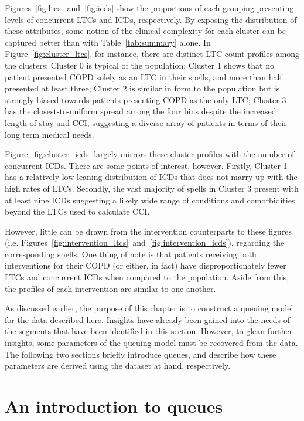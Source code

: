 Figures~\ref{fig:ltcs}~and~\ref{fig:icds} show the proportions of each grouping
presenting levels of concurrent LTCs and ICDs, respectively. By exposing the
distribution of these attributes, some notion of the clinical complexity for
each cluster can be captured better than with Table~\ref{tab:summary} alone. In
Figure~\ref{fig:cluster_ltcs}, for instance, there are distinct LTC count
profiles among the clusters: Cluster 0 is typical of the population; Cluster 1
shows that no patient presented COPD solely as an LTC in their spells, and more
than half presented at least three; Cluster 2 is similar in form to the
population but is strongly biased towards patients presenting COPD as the only
LTC; Cluster 3 has the closest-to-uniform spread among the four bins despite the
increased length of stay and CCI, suggesting a diverse array of patients in
terms of their long term medical needs.

Figure~\ref{fig:cluster_icds} largely mirrors these cluster profiles with the
number of concurrent ICDs. There are some points of interest, however. Firstly,
Cluster 1 has a relatively low-leaning distribution of ICDs that does not marry
up with the high rates of LTCs. Secondly, the vast majority of spells in Cluster
3 present with at least nine ICDs suggesting a likely wide range of conditions
and comorbidities beyond the LTCs used to calculate CCI.\

However, little can be drawn from the intervention counterparts to these figures
(i.e. Figures~\ref{fig:intervention_ltcs}~and~\ref{fig:intervention_icds}),
regarding the corresponding spells. One thing of note is that patients receiving
both interventions for their COPD (or either, in fact) have disproportionately
fewer LTCs and concurrent ICDs when compared to the population. Aside from this,
the profiles of each intervention are similar to one another.

As discussed earlier, the purpose of this chapter is to construct a queuing
model for the data described here. Insights have already been gained into the
needs of the segments that have been identified in this section. However, to
glean further insights, some parameters of the queuing model must be recovered
from the data. The following two sections briefly introduce queues, and describe
how these parameters are derived using the dataset at hand, respectively.


\section{An introduction to queues}\label{sec:queuing}

